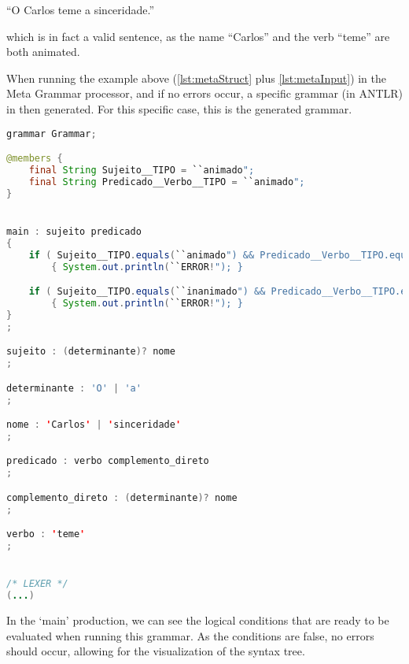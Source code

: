 ``O Carlos teme a sinceridade.''

\noindent which is in fact a valid sentence, as the name ``Carlos'' and the verb ``teme'' are both animated.

When running the example above (\autoref{lst:metaStruct} plus \autoref{lst:metaInput}) in the Meta Grammar processor, and if no errors occur, a specific grammar (in ANTLR) 
in then generated. For this specific case, this is the generated grammar.

\begin{center}
\begin{minipage}{15cm}
\begin{lstlisting}[language=java, basicstyle=\tiny, label={lst:case_study_sentence}, caption=Example of a specific generated grammar.]
grammar Grammar;

@members {
    final String Sujeito__TIPO = ``animado";
    final String Predicado__Verbo__TIPO = ``animado";
}


main : sujeito predicado
{
    if ( Sujeito__TIPO.equals(``animado") && Predicado__Verbo__TIPO.equals(``inanimado") ) 
        { System.out.println(``ERROR!"); }

    if ( Sujeito__TIPO.equals(``inanimado") && Predicado__Verbo__TIPO.equals(``animado") ) 
        { System.out.println(``ERROR!"); }
}
;

sujeito : (determinante)? nome 
;

determinante : 'O' | 'a'
;

nome : 'Carlos' | 'sinceridade'
;

predicado : verbo complemento_direto 
;

complemento_direto : (determinante)? nome 
;

verbo : 'teme'
;


/* LEXER */
(...)
\end{lstlisting}
\end{minipage}
\end{center}

In the ‘main’ production, we can see the logical conditions that are ready to be evaluated when running this grammar. As the conditions are false, no errors should occur,
allowing for the visualization of the syntax tree.


